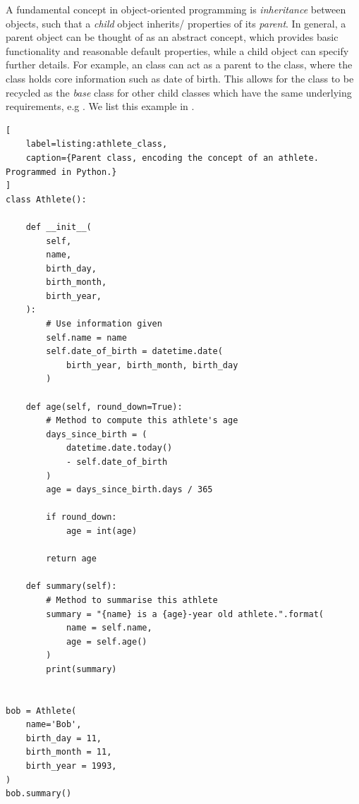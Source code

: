A fundamental concept in object-oriented programming is \emph{inheritance} between objects, 
    such that a \emph{child} object inherits/ properties of its \emph{parent}.
In general, a parent object can be thought of as an abstract concept, 
    which provides basic functionality and reasonable default properties,
    while a child object can specify further details. 
For example, an  class can act as a parent to the  class, 
    where the  class holds core information such as date of birth. 
This allows for the  class to be recycled as the \emph{base} class for other child classes
    which have the same underlying requirements, e.g . 
We list this example in . 

\begin{lstlisting}[
    label=listing:athlete_class,
    caption={Parent class, encoding the concept of an athlete. Programmed in Python.}
]
class Athlete():
    
    def __init__(
        self, 
        name, 
        birth_day, 
        birth_month, 
        birth_year, 
    ):
        # Use information given
        self.name = name
        self.date_of_birth = datetime.date(
            birth_year, birth_month, birth_day
        )
        
    def age(self, round_down=True):
        # Method to compute this athlete's age
        days_since_birth = ( 
            datetime.date.today() 
            - self.date_of_birth
        )
        age = days_since_birth.days / 365
        
        if round_down:
            age = int(age)
        
        return age
    
    def summary(self):
        # Method to summarise this athlete
        summary = "{name} is a {age}-year old athlete.".format(
            name = self.name, 
            age = self.age()
        )
        print(summary)
        
        
bob = Athlete(
    name='Bob',
    birth_day = 11,
    birth_month = 11, 
    birth_year = 1993, 
)
bob.summary()    
\end{lstlisting}

